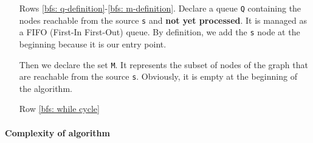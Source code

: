 \begin{itemize}
    \item[Rows \ref{bfs: q-definition}-\ref{bfs: m-definition}.] Declare a queue \texttt{Q} containing the nodes reachable from the source \texttt{s} and \textbf{not yet processed}. It is managed as a FIFO (First-In First-Out) queue. By definition, we add the \texttt{s} node at the beginning because it is our entry point.
    
    Then we declare the set \texttt{M}. It represents the subset of nodes of the graph that are reachable from the source \texttt{s}. Obviously, it is empty at the beginning of the algorithm.

    \item[Row \ref{bfs: while cycle}]
\end{itemize}

\paragraph{Complexity of algorithm}